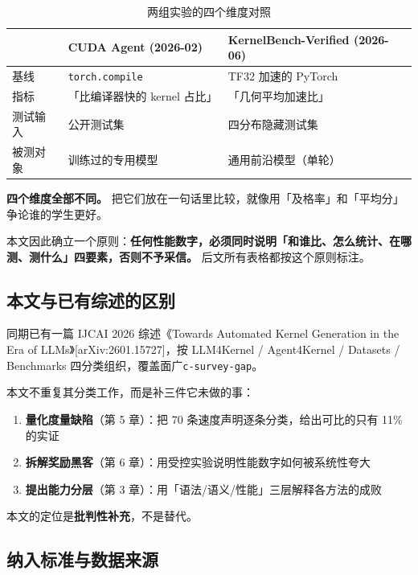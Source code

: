 \begin{table}[t]
\centering
\footnotesize
\setlength{\tabcolsep}{4pt}
\caption{两组实验的四个维度对照}
\label{tab:1}
\begin{tabular}{lll}
\toprule
 & CUDA Agent (2026-02) & KernelBench-Verified (2026-06) \\
\midrule
基线 & \texttt{torch.compile} & TF32 加速的 PyTorch \\
指标 & 「比编译器快的 kernel 占比」 & 「几何平均加速比」 \\
测试输入 & 公开测试集 & 四分布隐藏测试集 \\
被测对象 & 训练过的专用模型 & 通用前沿模型（单轮） \\
\bottomrule
\end{tabular}
\end{table}



\textbf{四个维度全部不同。} 把它们放在一句话里比较，就像用「及格率」和「平均分」争论谁的学生更好。


本文因此确立一个原则：\textbf{任何性能数字，必须同时说明「和谁比、怎么统计、在哪测、测什么」四要素，否则不予采信。} 后文所有表格都按这个原则标注。


\subsection{本文与已有综述的区别}

同期已有一篇 IJCAI 2026 综述《Towards Automated Kernel Generation in the Era of LLMs》[arXiv:2601.15727]，按 LLM4Kernel / Agent4Kernel / Datasets / Benchmarks 四分类组织，覆盖面广{\scriptsize\texttt{c-\hspace{0pt}survey-\hspace{0pt}gap}}。


本文不重复其分类工作，而是补三件它未做的事：


\begin{enumerate}
  \item \textbf{量化度量缺陷}（第 5 章）：把 70 条速度声明逐条分类，给出可比的只有 11\% 的实证
  \item \textbf{拆解奖励黑客}（第 6 章）：用受控实验说明性能数字如何被系统性夸大
  \item \textbf{提出能力分层}（第 3 章）：用「语法/语义/性能」三层解释各方法的成败
\end{enumerate}

本文的定位是\textbf{批判性补充}，不是替代。


\subsection{纳入标准与数据来源}

